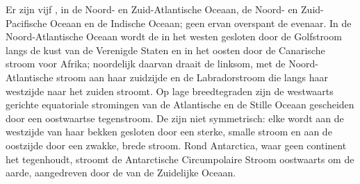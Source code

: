 Er zijn vijf , in de Noord- en Zuid-Atlantische Oceaan, de Noord- en Zuid-Pacifische Oceaan en de Indische Oceaan; geen ervan overspant de evenaar. In de Noord-Atlantische Oceaan wordt de  in het westen gesloten door de Golfstroom langs de kust van de Verenigde Staten en in het oosten door de Canarische stroom voor Afrika; noordelijk daarvan draait de  linksom, met de Noord-Atlantische stroom aan haar zuidzijde en de Labradorstroom die langs haar westzijde naar het zuiden stroomt. Op lage breedtegraden zijn de westwaarts gerichte equatoriale stromingen van de Atlantische en de Stille Oceaan gescheiden door een oostwaartse tegenstroom. De  zijn niet symmetrisch: elke  wordt aan de westzijde van haar bekken gesloten door een sterke, smalle stroom en aan de oostzijde door een zwakke, brede stroom. Rond Antarctica, waar geen continent het tegenhoudt, stroomt de Antarctische Circumpolaire Stroom oostwaarts om de aarde, aangedreven door de  van de Zuidelijke Oceaan.


